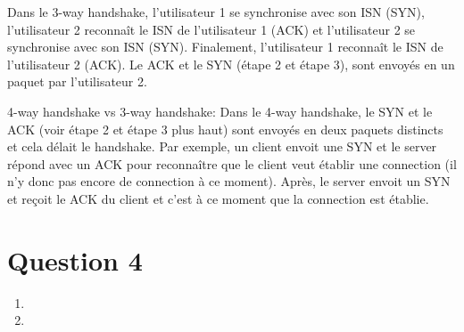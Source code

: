 \vspace{5mm} %
Dans le 3-way handshake, l’utilisateur 1 se synchronise avec  son ISN (SYN), l’utilisateur 2 reconnaît le ISN de l’utilisateur 1 (ACK) et l’utilisateur 2 se synchronise avec son ISN (SYN). Finalement, l’utilisateur 1 reconnaît le ISN de l’utilisateur 2 (ACK). Le ACK et le SYN (étape 2 et étape 3), sont envoyés en un paquet par l’utilisateur 2.
\vspace{5mm} %
\vspace{5mm} %

4-way handshake vs 3-way handshake:
Dans le 4-way handshake, le SYN et le ACK (voir étape 2 et étape 3 plus haut) sont envoyés en deux paquets distincts et cela délait le handshake. Par exemple, un client envoit une SYN et le server répond avec un ACK pour reconnaître que le client veut établir une connection (il n’y donc pas encore de connection à ce moment). Après, le server envoit un SYN et reçoit le ACK du client et c’est à ce moment que la connection est établie.

\section{Question 4}
\begin{enumerate}
	\item 
	\item 
\end{enumerate}

